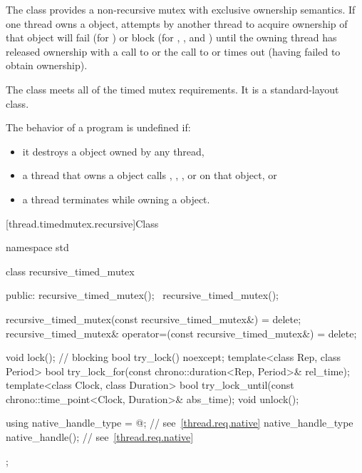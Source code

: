 \pnum
{}%
The class  provides a non-recursive mutex with exclusive ownership
semantics. If one thread owns a  object, attempts by another thread
to acquire ownership of that object will fail (for ) or block
(for , , and ) until
the owning thread has released ownership with a call to  or the
call to  or  times out (having
failed to obtain ownership).

\pnum
The class  meets
all of the timed mutex requirements.
It is a standard-layout class.

\pnum
The behavior of a program is undefined if:
\begin{itemize}
\item it destroys a  object owned by any thread,
\item a thread that owns a  object calls ,
, , or  on that object, or
\item a thread terminates while owning a  object.
\end{itemize}

[thread.timedmutex.recursive]{Class }

%
\begin{codeblock}
namespace std {
  class recursive_timed_mutex {
  public:
    recursive_timed_mutex();
    ~recursive_timed_mutex();

    recursive_timed_mutex(const recursive_timed_mutex&) = delete;
    recursive_timed_mutex& operator=(const recursive_timed_mutex&) = delete;

    void lock();    // blocking
    bool try_lock() noexcept;
    template<class Rep, class Period>
      bool try_lock_for(const chrono::duration<Rep, Period>& rel_time);
    template<class Clock, class Duration>
      bool try_lock_until(const chrono::time_point<Clock, Duration>& abs_time);
    void unlock();

    using native_handle_type = @\impdefnc@;          // see~\ref{thread.req.native}
    native_handle_type native_handle();                         // see~\ref{thread.req.native}
  };
}
\end{codeblock}

